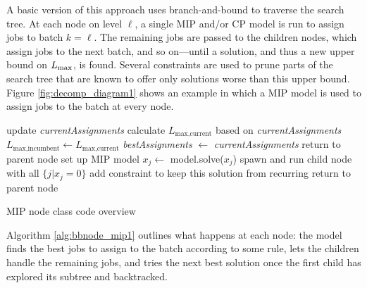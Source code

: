 \documentclass[13pt, letterpaper, oneside]{book}
\begin{document}
\label{sec:mipdecomp}
A basic version of this approach uses branch-and-bound to traverse the search
tree. At each node on level $\ell$, a single MIP and/or CP model is run to
assign jobs to batch $k = \ell$. The remaining jobs are passed to the children
nodes, which assign jobs to the next batch, and so on---until a solution, and
thus a new upper bound on $L_{\text{max}}$, is found. Several constraints are used to
prune parts of the search tree that are known to offer only solutions worse than
this upper bound. Figure \ref{fig:decomp_diagram1} shows an example in which a
MIP model is used to assign jobs to the batch at every node.
\begin{algorithm}[h]
\fontsize{9pt}{11.5pt}\selectfont
\begin{algorithmic}
\State update \textit{currentAssignments} 
 
  \State calculate $L_{\text{max,current}}$ based on \textit{currentAssignments}
    \State $L_{\text{max,incumbent}} \gets L_{\text{max,current}}$
    \State \textit{bestAssignments} $\gets$ \textit{currentAssignments}
  \EndIf
  \State return to parent node
\EndIf
\State set up MIP model 
\Repeat
  \State $x_j \gets$ model.solve($x_j$) 
  \State spawn and run child node with all $\{j | x_j = 0\}$ 
  \State add constraint to keep this solution from recurring 
\State return to parent node
\end{algorithmic}
\caption{MIP node class code overview}
\label{alg:bbnode_mip1}
\end{algorithm}
Algorithm \ref{alg:bbnode_mip1} outlines what happens at each node: the model
finds the best jobs to assign to the batch according to some rule, lets the
children handle the remaining jobs, and tries the next best solution once the
first child has explored its subtree and backtracked.
\end{document}
